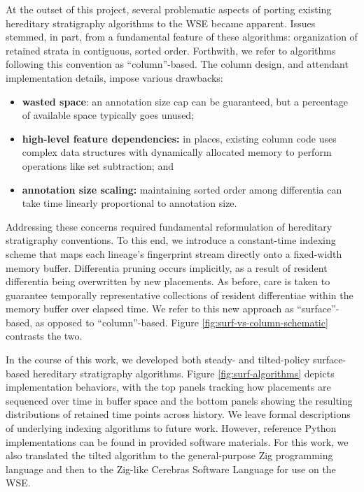 At the outset of this project, several problematic aspects of porting existing hereditary stratigraphy algorithms to the WSE became apparent.
Issues stemmed, in part, from a fundamental feature of these algorithms: organization of retained strata in contiguous, sorted order.
Forthwith, we refer to algorithms following this convention as ``column''-based.
The column design, and attendant implementation details, impose various drawbacks:
\begin{itemize}
\item \textbf{wasted space}: an annotation size cap can be guaranteed, but a percentage of available space typically goes unused;
\item \textbf{high-level feature dependencies:} in places, existing column code uses complex data structures with dynamically allocated memory to perform operations like set subtraction; and
\item \textbf{annotation size scaling:} maintaining sorted order among differentia can take time linearly proportional to annotation size.
\end{itemize}



\noindent
Addressing these concerns required fundamental reformulation of hereditary stratigraphy conventions.
To this end, we introduce a constant-time indexing scheme that maps each lineage's fingerprint stream directly onto a fixed-width memory buffer.
Differentia pruning occurs implicitly, as a result of resident differentia being overwritten by new placements.
As before, care is taken to guarantee temporally representative collections of resident differentiae within the memory buffer over elapsed time.
We refer to this new approach as ``surface''-based, as opposed to ``column''-based.
Figure \ref{fig:surf-vs-column-schematic} contrasts the two.



In the course of this work, we developed both steady- and tilted-policy surface-based hereditary stratigraphy algorithms.
Figure \ref{fig:surf-algorithms} depicts implementation behaviors, with the top panels tracking how placements are sequenced over time in buffer space and the bottom panels showing the resulting distributions of retained time points across history.
We leave formal descriptions of underlying indexing algorithms to future work.
However, reference Python implementations can be found in provided software materials.
For this work, we also translated the tilted algorithm to the general-purpose Zig programming language and then to the Zig-like Cerebras Software Language for use on the WSE.

